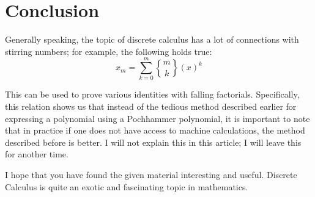 \documentclass{article}
\begin{document}
\section{Conclusion}

Generally speaking, the topic of discrete calculus has a lot of connections with stirring numbers; for example, the following holds true:
\begin{equation}
	x_m = \sum_{k = 0}^m { m \brace k } (x)^k
\end{equation}

This can be used to prove various identities with falling factorials. Specifically, this relation shows us that instead of the tedious method described earlier for expressing a polynomial using a Pochhammer polynomial, it is important to note that in practice if one does not have access to machine calculations, the method described before is better.
I will not explain this in this article; I will leave this for another time.

I hope that you have found the given material interesting and useful. Discrete Calculus is quite an exotic and fascinating topic in mathematics.

\tableofcontents
\end{document}
